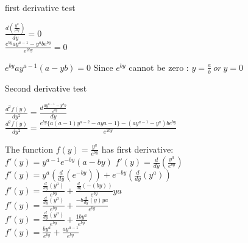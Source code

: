 \documentclass[]{article}
\begin{document}
first derivative test

\(\frac{d(\frac{y^a}{e^{by}})}{dy} = 0\)\\
\(\frac{e^{by}ay^{a-1}-y^abe^{by}}{e^{2by}}=0\)

\(e^{by}ay^{a-1}(a-yb) = 0\) Since \(e^{by}\) cannot be zero :
\(y = \frac{a}{b}~or~y =0\)

Second derivative test

\(\frac{d^2f(y)}{dy^2} = \frac{d\frac{ay^{a-1}-y^ab}{e^{by}}}{dy}\)\\
\(\frac{d^2f(y)}{dy^2} = \frac{e^{by}\{a(a-1)y^{a-2}-ay{a-1}\}-(ay^{a-1}-y^a)be^{by}}{e^{2by}}\)

The function \(f(y) = \frac{y^a}{e^{by}}\) has first derivative:\\
\(f'(y) = y^{a-1}e^{-by}(a-by)\)
\(f'(y) = \frac{d}{dy}(\frac{y^a}{e^{by}})\)\\
\(f'(y) = y^a(\frac{d}{dy}(e^{-by})) + e^{-by}(\frac{d}{dy}(y^a))\)\\
\(f'(y) = \frac{\frac{d}{dy}(y^a)}{e^{by}} + \frac{\frac{d}{dy}(-(by))}{e^{by}}ya\)\\
\(f'(y) = \frac{\frac{d}{dy}(y^a)}{e^{by}} + \frac{-b\frac{d}{dy}(y)ya}{e^{by}}\)\\
\(f'(y) = \frac{\frac{d}{dy}(y^a)}{e^{by}} + \frac{1by^a}{e^{by}}\)\\
\(f'(y) = \frac{by^a}{e^{by}} + \frac{ay^{a-1}}{e^{by}}\)
\end{document}
